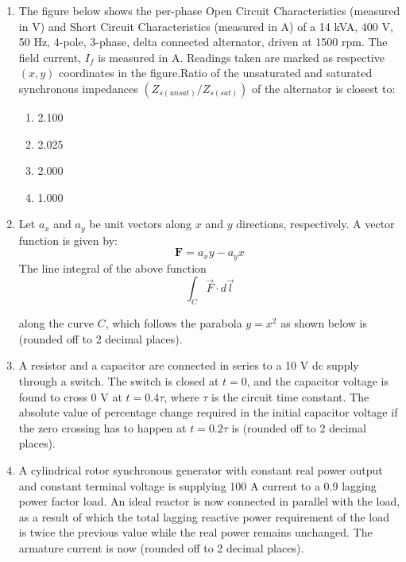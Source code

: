 \documentclass[journal,12pt,onecolumn]{IEEEtran}
\theoremstyle{remark}
\begin{document}
\begin{enumerate}
    \item The figure below shows the per-phase Open Circuit Characteristics (measured in V) and Short Circuit Characteristics (measured in A) of a 14 kVA, 400 V, 50 Hz, 4-pole, 3-phase, delta connected alternator, driven at 1500 rpm. The field current, $I_f$ is measured in A. Readings taken are marked as respective $(x, y)$ coordinates in the figure.Ratio of the unsaturated and saturated synchronous impedances $(Z_{s(unsat)}/Z_{s(sat)})$ of the alternator is closest to:

      \begin{figure}[H]
        \centering
          
    \end{figure}
    \begin{enumerate}
        \item 2.100
        \item 2.025
        \item 2.000
        \item 1.000
    \end{enumerate}

    \item Let $a_x$ and $a_y$ be unit vectors along $x$ and $y$ directions, respectively. A vector function is given by:
    $$
    \mathbf{F} = a_x y - a_y x
    $$
    The line integral of the above function 
    $$\int_C \vec{F} \cdot d\vec{l}$$

    
    along the curve $C$, which follows the parabola $y = x^2$ as shown below is {\underline{\hspace{1cm}}} (rounded off to 2 decimal places).
      \begin{figure}[H]
        \centering
    \end{figure}
   

    \item A resistor and a capacitor are connected in series to a 10 V dc supply through a switch. The switch is closed at $t = 0$, and the capacitor voltage is found to cross 0 V at $t=0.4\tau$, where $\tau$ is the circuit time constant. The absolute value of percentage change required in the initial capacitor voltage if the zero crossing has to happen at $t= 0.2\tau$ is {\underline{\hspace{2cm}}} (rounded off to 2 decimal places).
  

    \item A cylindrical rotor synchronous generator with constant real power output and constant terminal voltage is supplying 100 A current to a 0.9 lagging power factor load. An ideal reactor is now connected in parallel with the load, as a result of which the total lagging reactive power requirement of the load is twice the previous value while the real power remains unchanged. The armature current is now {\underline{\hspace{2cm}}}(rounded off to 2 decimal places).
   


\end{enumerate}
\end{document}
